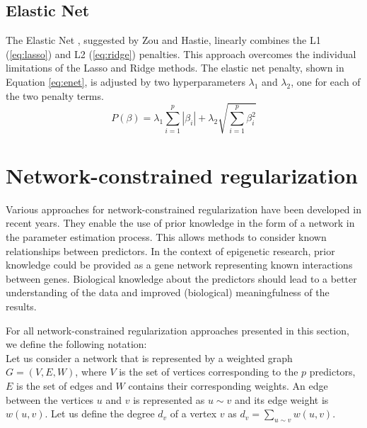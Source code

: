 \subsection{Elastic Net} \label{sec:enet}
The Elastic Net \cite{zou2005regularization}, suggested by Zou and Hastie, linearly combines the L1 (\ref{eq:lasso}) and L2 (\ref{eq:ridge}) penalties. This approach overcomes the individual limitations of the Lasso and Ridge methods. The elastic net penalty, shown in Equation \ref{eq:enet}, is adjusted by two hyperparameters $\lambda_1$ and $\lambda_2$, one for each of the two penalty terms.
\begin{equation} \label{eq:enet}
P(\beta) = \lambda_1\sum_{i=1}^{p}\left|\beta_i\right| + \lambda_2\sqrt{\sum_{i=1}^{p}\beta_i^2}
\end{equation}


\section{Network-constrained regularization}
Various approaches for network-constrained regularization have been developed in recent years. They enable the use of prior knowledge in the form of a network in the parameter estimation process. This allows methods to consider known relationships between predictors. In the context of epigenetic research, prior knowledge could be provided as a gene network representing known interactions between genes. Biological knowledge about the predictors should lead to a better understanding of the data and improved (biological) meaningfulness of the results.

For all network-constrained regularization approaches presented in this section, we define the following notation:\\
Let us consider a network that is represented by a weighted graph $G = (V, E, W)$, where $V$ is the set of vertices corresponding to the $p$ predictors, $E$ is the set of edges and $W$ contains their corresponding weights. An edge between the vertices $u$ and $v$ is represented as $u \sim v$ and its edge weight is $w(u,v)$. Let us define the degree $d_v$ of a vertex $v$ as $d_v = \sum_{u \sim v}w(u,v)$.


